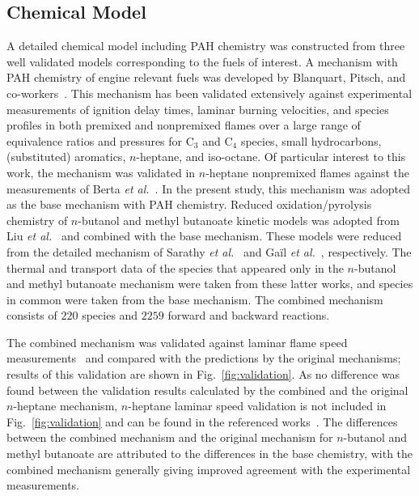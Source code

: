\documentclass[review,3p,times]{elsarticleUS}
\begin{document}
\subsection{Chemical Model} 

A detailed chemical model including PAH chemistry was constructed from three well validated models corresponding to the fuels of interest. A mechanism with PAH chemistry of engine relevant fuels was developed by Blanquart, Pitsch, and co-workers~\cite{blanquart09b,narayanaswamy10}. This mechanism has been validated extensively against experimental measurements of ignition delay times, laminar burning velocities, and species profiles in both premixed and nonpremixed flames over a large range of equivalence ratios and pressures for C$_3$ and C$_4$ species, small hydrocarbons, (substituted) aromatics, $n$-heptane, and iso-octane. Of particular interest to this work, the mechanism was validated in $n$-heptane nonpremixed flames against the measurements of Berta \emph{et al.}~\cite{berta06}. In the present study, this mechanism was adopted as the base mechanism with PAH chemistry. Reduced oxidation/pyrolysis chemistry of $n$-butanol and methyl butanoate kinetic models was adopted from Liu \emph{et al.}~\cite{liu11} and combined with the base mechanism.  These models were reduced from the detailed mechanism of Sarathy \emph{et al.}~\cite{sarathy09} and Ga\"il \emph{et al.}~\cite{gail08}, respectively. The thermal and transport data of the species that appeared only in the $n$-butanol and methyl butanoate mechanism were taken from these latter works, and species in common were taken from the base mechanism. The combined mechanism consists of $220$ species and $2259$ forward and backward reactions. 

The combined mechanism  was validated against laminar flame speed measurements~\cite{liu11} and compared with the predictions by the original mechanisms; results of this validation are shown in Fig.~\ref{fig:validation}.  As no difference was found between the validation results calculated by the combined and the original $n$-heptane mechanism, $n$-heptane laminar speed validation is not included in Fig.~\ref{fig:validation} and can be found in the referenced works~\cite{blanquart09b,narayanaswamy10}.  The differences between the combined mechanism and the original mechanism for $n$-butanol and methyl butanoate are attributed to the differences in the base chemistry, with the combined mechanism generally giving improved agreement with the experimental measurements.  
\end{document}
